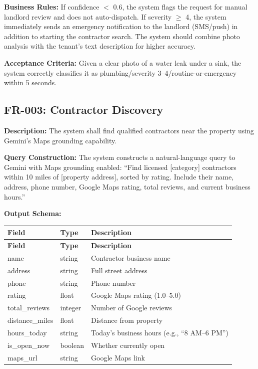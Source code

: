 \documentclass[12pt,a4paper]{article}
\begin{document}
\textbf{Business Rules:} If confidence $<$ 0.6, the system flags the request for manual landlord review and does not auto-dispatch. If severity $\geq$ 4, the system immediately sends an emergency notification to the landlord (SMS/push) in addition to starting the contractor search. The system should combine photo analysis with the tenant's text description for higher accuracy.

\textbf{Acceptance Criteria:} Given a clear photo of a water leak under a sink, the system correctly classifies it as plumbing/severity 3--4/routine-or-emergency within 5 seconds.

\subsection{FR-003: Contractor Discovery}

\textbf{Description:} The system shall find qualified contractors near the property using Gemini's Maps grounding capability.

\textbf{Query Construction:} The system constructs a natural-language query to Gemini with Maps grounding enabled: ``Find licensed [category] contractors within 10 miles of [property address], sorted by rating. Include their name, address, phone number, Google Maps rating, total reviews, and current business hours.''

\textbf{Output Schema:}

\begin{longtable}{L{3cm} L{2cm} L{8.5cm}}
\toprule
\textbf{Field} & \textbf{Type} & \textbf{Description} \\
\midrule
\endfirsthead
\toprule
\textbf{Field} & \textbf{Type} & \textbf{Description} \\
\midrule
\endhead
\bottomrule
\endfoot
name & string & Contractor business name \\
\midrule
address & string & Full street address \\
\midrule
phone & string & Phone number \\
\midrule
rating & float & Google Maps rating (1.0--5.0) \\
\midrule
total\_reviews & integer & Number of Google reviews \\
\midrule
distance\_miles & float & Distance from property \\
\midrule
hours\_today & string & Today's business hours (e.g., ``8 AM--6 PM'') \\
\midrule
is\_open\_now & boolean & Whether currently open \\
\midrule
maps\_url & string & Google Maps link \\
\end{longtable}
\end{document}
